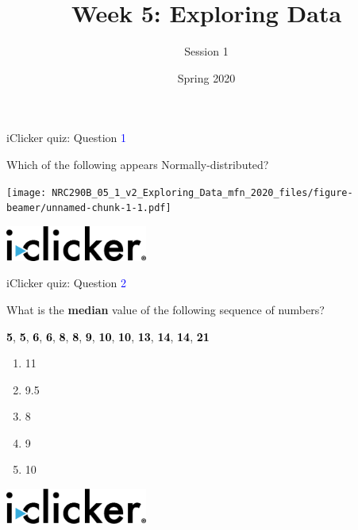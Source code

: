 \documentclass[ignorenonframetext,]{beamer}
\title{Week 5: Exploring Data}
\subtitle{Session 1}
\date{Spring 2020}
\begin{document}
\frame{\titlepage}

\begin{frame}{iClicker quiz: Question \textcolor{blue}{1}}

Which of the following appears Normally-distributed?

\texttt{[image: NRC290B\_05\_1\_v2\_Exploring\_Data\_mfn\_2020\_files/figure-beamer/unnamed-chunk-1-1.pdf]}

\begin{multicols}{2}
\null \vfill
\vfill \null
\columnbreak
\includegraphics[width = 0.35\textwidth]{../slide_images/iClicker_logo.png}

\end{multicols}

\end{frame}

\begin{frame}{iClicker quiz: Question \textcolor{blue}{2}}

What is the \textbf{median} value of the following sequence of numbers?

\begin{center}
\textbf{\textcolor{black}{5}}, \textbf{\textcolor{black}{5}}, \textbf{\textcolor{black}{6}}, \textbf{\textcolor{black}{6}}, \textbf{\textcolor{black}{8}}, \textbf{\textcolor{black}{8}}, \textbf{\textcolor{black}{9}}, \textbf{\textcolor{black}{10}}, \textbf{\textcolor{black}{10}}, \textbf{\textcolor{black}{13}}, \textbf{\textcolor{black}{14}}, \textbf{\textcolor{black}{14}}, \textbf{\textcolor{black}{21}}
\end{center}

\begin{enumerate}[A]
\item 11
\item 9.5
\item 8
\item 9
\item 10
\end{enumerate}

\begin{multicols}{2}
\null \vfill
\vfill \null
\columnbreak
\includegraphics[width = 0.35\textwidth]{../slide_images/iClicker_logo.png}

\end{multicols}

\end{frame}
\end{document}
